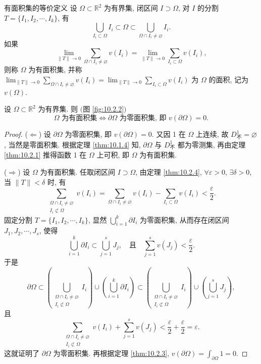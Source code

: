 \setcounter{definition}{2}
\begin{definitionp}{有面积集的等价定义}\label{def:10.2.2p}
设 $\Omega \subset \mathbb{R}^2$ 为有界集, 闭区间 $I \supset \Omega$, 对 $I$ 的分割 $T = \{I_1, I_2, \cdots, I_k\}$, 有
\[
\bigcup_{I_i\subset\Omega}I_i \subset \Omega \subset \bigcup_{\Omega\cap I_i\neq\varnothing}I_i.
\]
如果
\[
\lim_{\|T\|\to 0}\sum_{\Omega\cap I_i\neq\varnothing}v(I_i) = \lim_{\|T\|\to 0}\sum_{I_i\subset\Omega}v(I_i),
\]
则称 $\Omega$ 为有面积集, 并称 $\lim_{\|T\|\to 0}\sum_{\Omega\cap I_i\neq\varnothing}v(I_i) = \lim_{\|T\|\to 0}\sum_{I_i\subset\Omega}v(I_i)$ 为 $\Omega$ 的面积, 记为 $v(\Omega)$.
\end{definitionp}

\begin{theorem}[有面积集的几何特征二]\label{thm:10.2.5}
设 $\Omega \subset \mathbb{R}^2$ 为有界集. 则 $($图 \ref{fig:10.2.2}$)$
\[
\Omega \text{ 为有面积集} \iff \partial\Omega \text{ 为零面积集, 即 } v(\partial\Omega)=0.
\]
\end{theorem}

\begin{proof}
($\Leftarrow$) 设 $\partial\Omega$ 为零面积集, 即 $v(\partial\Omega)=0$. 又因 1 在 $\Omega$ 上连续, 故 $D_{\text{不}}^1 = \varnothing$, 当然是零面积集. 根据定理 \ref{thm:10.1.4} 知, $\partial\Omega$ 与 $D_{\text{不}}^1$ 都为零测集, 再由定理 \ref{thm:10.2.1} 推得函数 1 在 $\Omega$ 上可积, 即 $\Omega$ 为有面积集.

($\Rightarrow$) 设 $\Omega$ 为有面积集. 任取闭区间 $I \supset \Omega$, 由定理 \ref{thm:10.2.4}, $\forall\varepsilon>0$, $\exists\delta>0$, 当 $\|T\|<\delta$ 时, 有
\[
\sum_{\substack{\Omega\cap I_i\neq\varnothing \\ I_i\not\subset\Omega}}v(I_i) = \sum_{\Omega\cap I_i\neq\varnothing}v(I_i) - \sum_{I_i\subset\Omega}v(I_i) < \frac{\varepsilon}{2}.
\]
固定分割 $T=\{I_1,I_2,\cdots,I_k\}$, 显然 $\bigcup_{i=1}^{k}\partial I_i$ 为零面积集, 从而存在闭区间 $J_1,J_2,\cdots,J_s$, 使得
\[
\bigcup_{i=1}^{k}\partial I_i \subset \bigcup_{j=1}^{s}J_j, \quad \text{且} \quad \sum_{j=1}^{s}v(J_j) < \frac{\varepsilon}{2}.
\]
于是
\[
\partial\Omega \subset \left(\bigcup_{\substack{\Omega\cap I_i\neq\varnothing \\ I_i\not\subset\Omega}}I_i\right) \cup \left(\bigcup_{i=1}^{k}\partial I_i\right) \subset \left(\bigcup_{\substack{\Omega\cap I_i\neq\varnothing \\ I_i\not\subset\Omega}}I_i\right) \cup \left(\bigcup_{j=1}^{s}J_j\right),
\]
且
\[
\sum_{\substack{\Omega\cap I_i\neq\varnothing \\ I_i\not\subset\Omega}}v(I_i) + \sum_{j=1}^{s}v(J_j) < \frac{\varepsilon}{2} + \frac{\varepsilon}{2} = \varepsilon.
\]
这就证明了 $\partial\Omega$ 为零面积集. 再根据定理 \ref{thm:10.2.3}, $v(\partial\Omega)=\int_{\partial\Omega}1=0$.
\end{proof}

